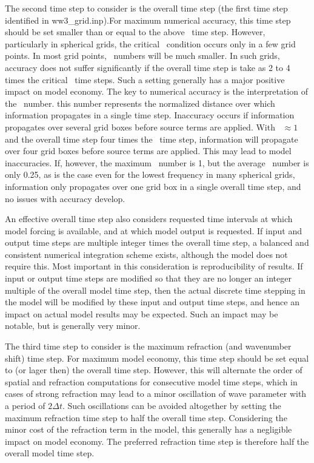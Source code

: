 The second time step to consider is the overall time step (the first time step
identified in {\file ww3\_grid.inp}).For maximum numerical accuracy, this time
step should be set smaller than or equal to the above \cfl\ time step.
However, particularly in spherical grids, the critical \cfl\ condition occurs
only in a few grid points. In most grid points, \cfl\ numbers will be much
smaller. In such grids, accuracy does not suffer significantly if the overall
time step is take as 2 to 4 times the critical \cfl\ time steps. Such a
setting generally has a major positive impact on model economy. The key to
numerical accuracy is the interpretation of the \cfl\ number. this number
represents the normalized distance over which information propagates in a
single time step. Inaccuracy occurs if information propagates over several
grid boxes before source terms are applied. With \cfl\ $\approx 1$ and the
overall time step four times the \cfl\ time step, information will propagate
over four grid boxes before source terms are applied. This may lead to model
inaccuracies. If, however, the maximum \cfl\ number is 1, but the average
\cfl\ number is only 0.25, as is the case even for the lowest frequency in
many spherical grids, information only propagates over one grid box in a
single overall time step, and no issues with accuracy develop.

An effective overall time step also considers requested time intervals at
which model forcing is available, and at which model output is requested. If
input and output time steps are multiple integer times the overall time step,
a balanced and consistent numerical integration scheme exists, although the
model does not require this. Most important in this consideration is
reproducibility of results. If input or output time steps are modified so that
they are no longer an integer multiple of the overall model time step, then
the actual discrete time stepping in the model will be modified by these input
and output time steps, and hence an impact on actual model results may be
expected. Such an impact may be notable, but is generally very minor.

The third time step to consider is the maximum refraction (and wavenumber
shift) time step. For maximum model economy, this time step should be set
equal to (or lager then) the overall time step. However, this will alternate
the order of spatial and refraction computations for consecutive model time
steps, which in cases of strong refraction may lead to a minor oscillation of
wave parameter with a period of $2 \Delta t$. Such oscillations can be avoided
altogether by setting the maximum refraction time step to half the overall
time step. Considering the minor cost of the refraction term in the model,
this generally has a negligible impact on model economy. The preferred
refraction time step is therefore half the overall model time step.

